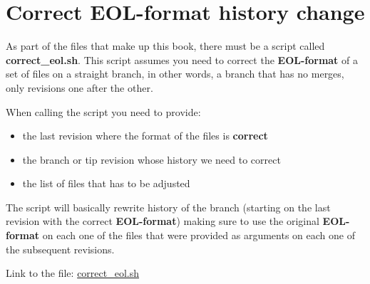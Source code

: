 
\section{Correct EOL-format history change}
\label{correct_eol_history}

As part of the files that make up this book, there must be a script called {\bf correct\_eol.sh}. This script assumes
you need to correct the {\bf EOL-format} of a set of files on a straight branch, in other words, a branch that has no merges, only revisions
one after the other.

When calling the script you need to provide:
\begin{itemize}
	\item the last revision where the format of the files is {\bf correct}
	\item the branch or tip revision whose history we need to correct
	\item the list of files that has to be adjusted
\end{itemize}

The script will basically rewrite history of the branch (starting on the last revision with the correct {\bf EOL-format})
making sure to use the original {\bf EOL-format} on each one of the files that were provided as arguments on each one of
the subsequent revisions.

Link to the file: \href{https://github.com/eantoranz/conflict_book/blob/main/scripts/correct_eol.sh}{correct\_eol.sh}
